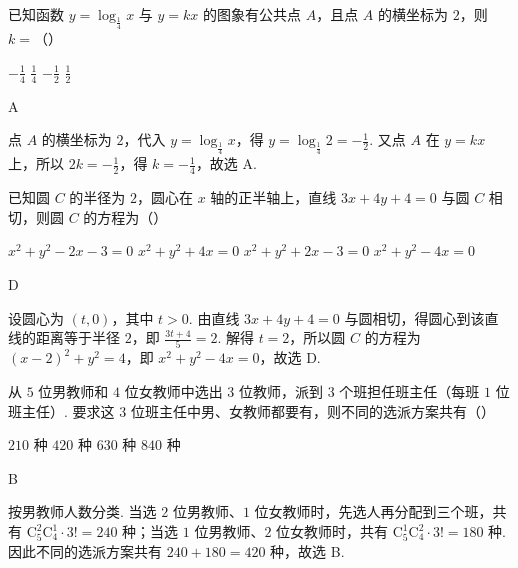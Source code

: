 \begin{problem}
已知函数 \( y = \log_{\frac{1}{4}} x \) 与 \( y = kx \) 的图象有公共点 \(A\)，且点 \(A\) 的横坐标为 \(2\)，则 \( k = \)（\quad）

\choices
    {\(-\frac{1}{4}\)}
    {\(\frac{1}{4}\)}
    {\(-\frac{1}{2}\)}
    {\(\frac{1}{2}\)}
\end{problem}

\begin{answer}
A
\end{answer}

\begin{solution}
点 \(A\) 的横坐标为 \(2\)，代入 \(y=\log_{\frac{1}{4}}x\)，得 \(y=\log_{\frac{1}{4}}2=-\frac{1}{2}\). 又点 \(A\) 在 \(y=kx\) 上，所以 \(2k=-\frac{1}{2}\)，得 \(k=-\frac{1}{4}\)，故选 A.
\end{solution}

\begin{problem}
已知圆 \(C\) 的半径为 \(2\)，圆心在 \(x\) 轴的正半轴上，直线 \(3x + 4y + 4 = 0\) 与圆 \(C\) 相切，则圆 \(C\) 的方程为（\quad）

\choices
    {\(x^{2} + y^{2} - 2x - 3 = 0\)}
    {\(x^{2} + y^{2} + 4x = 0\)}
    {\(x^{2} + y^{2} + 2x - 3 = 0\)}
    {\(x^{2} + y^{2} - 4x = 0\)}
\end{problem}

\begin{answer}
D
\end{answer}

\begin{solution}
设圆心为 \((t,0)\)，其中 \(t>0\). 由直线 \(3x+4y+4=0\) 与圆相切，得圆心到该直线的距离等于半径 \(2\)，即 \(\frac{3t+4}{5}=2\). 解得 \(t=2\)，所以圆 \(C\) 的方程为 \((x-2)^2+y^2=4\)，即 \(x^2+y^2-4x=0\)，故选 D.
\end{solution}

\begin{problem}
从 \(5\) 位男教师和 \(4\) 位女教师中选出 \(3\) 位教师，派到 \(3\) 个班担任班主任（每班 \(1\) 位班主任）. 要求这 \(3\) 位班主任中男、女教师都要有，则不同的选派方案共有（\quad）

\choices
    {\(210\) 种}
    {\(420\) 种}
    {\(630\) 种}
    {\(840\) 种}
\end{problem}

\begin{answer}
B
\end{answer}

\begin{solution}
按男教师人数分类. 当选 \(2\) 位男教师、\(1\) 位女教师时，先选人再分配到三个班，共有 \(\mathrm C_5^2\mathrm C_4^1\cdot3!=240\) 种；当选 \(1\) 位男教师、\(2\) 位女教师时，共有 \(\mathrm C_5^1\mathrm C_4^2\cdot3!=180\) 种. 因此不同的选派方案共有 \(240+180=420\) 种，故选 B.
\end{solution}

